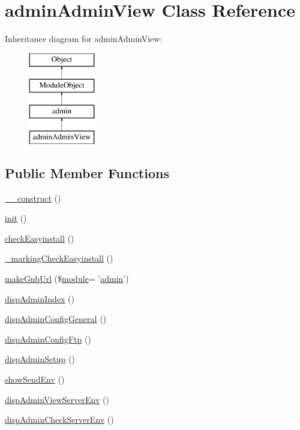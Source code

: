 \hypertarget{classadminAdminView}{\section{admin\-Admin\-View Class Reference}
\label{classadminAdminView}
}
Inheritance diagram for admin\-Admin\-View\-:\begin{figure}[H]
\begin{center}
\leavevmode
\includegraphics[height=4.000000cm]{classadminAdminView}
\end{center}
\end{figure}
\subsection*{Public Member Functions}
\begin{DoxyCompactItemize}
\item 
\hyperlink{classadminAdminView_a8bf927cf8a3c6554d083a29f90a8e3eb}{\-\_\-\-\_\-construct} ()
\item 
\hyperlink{classadminAdminView_a9211d29a895ebead46f78e6fc9eab285}{init} ()
\item 
\hyperlink{classadminAdminView_ae7b11554f7c30beb8554d15b33852dd7}{check\-Easyinstall} ()
\item 
\hyperlink{classadminAdminView_ad1fe5e140900ad8f5814871ed6ae9508}{\-\_\-marking\-Check\-Easyinstall} ()
\item 
\hyperlink{classadminAdminView_ade77034df3a5bc074b5a1f1cb4c47419}{make\-Gnb\-Url} (\$\hyperlink{classmodule}{module}= '\hyperlink{classadmin}{admin}')
\item 
\hyperlink{classadminAdminView_aff78cea8f2e5632395dd4888742389b8}{disp\-Admin\-Index} ()
\item 
\hyperlink{classadminAdminView_accaee16084bc6def9e841518d227be0e}{disp\-Admin\-Config\-General} ()
\item 
\hyperlink{classadminAdminView_ac1d596c739213d4fd3f127a6ca18c155}{disp\-Admin\-Config\-Ftp} ()
\item 
\hyperlink{classadminAdminView_acfa4a5d1209080974ca5fd15d04565e9}{disp\-Admin\-Setup} ()
\item 
\hyperlink{classadminAdminView_a4c4c900f637d618a7c8fbcbf523ad801}{show\-Send\-Env} ()
\item 
\hyperlink{classadminAdminView_a6b110bb8ccba975a670fdfbe559f7118}{disp\-Admin\-View\-Server\-Env} ()
\item 
\hyperlink{classadminAdminView_a4041d717f643f568e4aad570e8a60e47}{disp\-Admin\-Check\-Server\-Env} ()
\end{DoxyCompactItemize}
